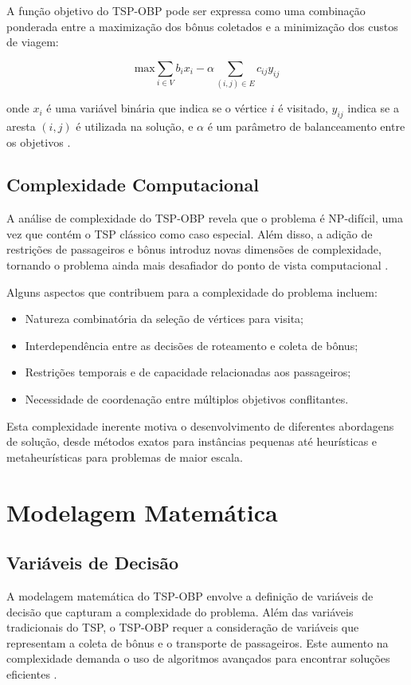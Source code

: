 \documentclass[12pt, a4paper]{report}
\begin{document}
A função objetivo do TSP-OBP pode ser expressa como uma combinação ponderada entre a maximização dos bônus coletados e a minimização dos custos de viagem:

\begin{equation}
    \text{max} \sum_{i \in V} b_i x_i - \alpha \sum_{(i,j) \in E} c_{ij} y_{ij}
\end{equation}

onde $x_i$ é uma variável binária que indica se o vértice $i$ é visitado, $y_{ij}$ indica se a aresta $(i,j)$ é utilizada na solução, e $\alpha$ é um parâmetro de balanceamento entre os objetivos \cite{lopesfilho2019}.

\section{Complexidade Computacional}
A análise de complexidade do TSP-OBP revela que o problema é NP-difícil, uma vez que contém o TSP clássico como caso especial. Além disso, a adição de restrições de passageiros e bônus introduz novas dimensões de complexidade, tornando o problema ainda mais desafiador do ponto de vista computacional \cite{carvalho2022}.

Alguns aspectos que contribuem para a complexidade do problema incluem:

\begin{itemize}
    \item Natureza combinatória da seleção de vértices para visita;
    \item Interdependência entre as decisões de roteamento e coleta de bônus;
    \item Restrições temporais e de capacidade relacionadas aos passageiros;
    \item Necessidade de coordenação entre múltiplos objetivos conflitantes.
\end{itemize}

Esta complexidade inerente motiva o desenvolvimento de diferentes abordagens de solução, desde métodos exatos para instâncias pequenas até heurísticas e metaheurísticas para problemas de maior escala.

\chapter{Modelagem Matemática}

\section{Variáveis de Decisão}
A modelagem matemática do TSP-OBP envolve a definição de variáveis de decisão que capturam a complexidade do problema. Além das variáveis tradicionais do TSP, o TSP-OBP requer a consideração de variáveis que representam a coleta de bônus e o transporte de passageiros. Este aumento na complexidade demanda o uso de algoritmos avançados para encontrar soluções eficientes \cite{carvalho2022}.
\end{document}

